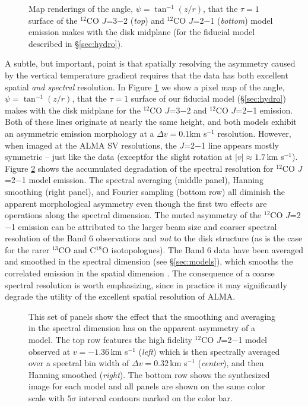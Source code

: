 \begin{figure}[t!]
\caption{Map renderings of the angle, $\psi = \tan^{-1}(z/r)$, that the 
$\tau = 1$ surface of the $^{12}$CO $J$=3$-$2 ({\it top}) and $^{12}$CO 
$J$=2$-$1 ({\it bottom}) model emission makes with the disk midplane (for the 
fiducial model described in \S\ref{sec:hydro}). 
\label{fig:psi}}
\end{figure}

A subtle, but important, point is that spatially resolving the asymmetry caused
by the vertical temperature gradient requires that the data has both excellent 
spatial {\it and spectral} resolution.  In Figure \ref{fig:psi} we show a 
pixel map of the angle, $\psi = \tan^{-1}(z/r)$, that the $\tau=1$ surface of 
our fiducial model (\S\ref{sec:hydro}) makes with the disk midplane for the 
$^{12}$CO $J$=3$-$2 and $^{12}$CO $J$=2$-$1 emission.  Both of these lines 
originate at nearly the same height, and both models exhibit an asymmetric 
emission morphology at a $\Delta v = 0.1$km s$^{-1}$ resolution.  However,
when imaged at the ALMA SV resolutions, the $J$=2$-$1 line appears mostly 
symmetric -- just like the data (exceptfor the slight rotation at 
$|v| \approx 1.7$\,km s$^{-1}$).  Figure \ref{fig:spec_effects} shows the 
accumulated degradation of the spectral 
resolution for $^{12}$CO $J$=2$-$1 model emission.  The spectral averaging 
(middle panel), Hanning smoothing (right panel), and Fourier sampling (bottom 
row) all diminish the apparent morphological asymmetry even though the first 
two effects are operations along the spectral dimension.  The muted asymmetry of
the $^{12}$CO $J$=2$-$1 emission can be attributed to the larger beam size and 
coarser spectral resolution of the Band 6 observations and {\it not} to the disk
structure (as is the case for the rarer $^{13}$CO and C$^{18}$O isotopologues). 
The Band 6 data have been averaged and smoothed in the spectral dimension (see 
\S\ref{sec:models}), which smooths the correlated emission in the spatial 
dimension \citep{thompson86}.  The consequence of a coarse spectral resolution 
is worth emphasizing, since in practice it may significantly degrade the utility
of the excellent spatial resolution of ALMA.

\begin{figure}[t!]
\caption{This set of panels show the effect that the smoothing and averaging 
in the spectral dimension has on the apparent asymmetry of a model.  The top 
row features the high fidelity $^{12}$CO $J$=2$-$1 model observed at 
$v=-1.36$\,km s$^{-1}$ ({\it left}) which is then spectrally averaged over 
a spectral bin width of $\Delta v = 0.32$\,km s$^{-1}$ ({\it center}), and then 
Hanning smoothed ({\it right}). The bottom row shows the synthesized image for 
each model and all panels are shown on the same color scale with
$5\sigma$ interval contours marked on the color bar.
\label{fig:spec_effects}}
\end{figure}

